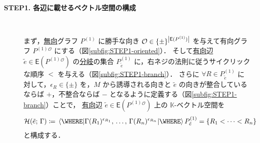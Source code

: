 \documentclass[TQFT_main]{subfiles}
\begin{document}
\begin{description}
    \item[\textbf{STEP1. 各辺に載せるベクトル空間の構成}]　

    まず，\underline{無向}グラフ $P^{(1)}$ に勝手な向き $\mathcal{O} \in \{\pm\}^{\abs{\mathsf{E}(P^{(1)})}}$ を与えて有向グラフ $P^{(1)}{}^{\mathcal{O}}$ にする（図\ref{subfig:STEP1-oriented}）．
    そして\underline{有向}辺 $\tilde{e} \in \mathsf{E}(P^{(1)}{}^{\mathcal{O}})$ の\hyperref[def:polyhedron]{分岐}の集合 $P^{(1)}_{\tilde{e}}$ に，右ネジの法則に従うサイクリックな順序 $<$ を与える（図\ref{subfig:STEP1-branch}）．
    さらに $\forall R \in P_{\tilde{e}}^{(1)}$ に対して，$\epsilon_R \in \{\pm\}$ を，$M$ から誘導される向きと $\tilde{e}$ の向きが整合しているならば $+$，不整合ならば $-$ となるように定義する（図\ref{subfig:STEP1-branch}）ことで，
    \underline{有向}辺 $\tilde{e} \in \mathsf{E}(P^{(1)}{}^{\mathcal{O}})$ 上の $\mathbb{K}$-ベクトル空間を
    \begin{align}
        \mathcal{H}(\tilde{e};\, \Gamma) \coloneqq \expval{\Gamma(R_1)^{\epsilon_{R_1}},\, \dots,\, \Gamma(R_n)^{\epsilon_{R_n}}} \WHERE P_{\tilde{e}}^{(1)} = \{R_1 < \cdots < R_n\}
    \end{align}
    と構成する．

    \begin{figure}[H]
        \centering
        \begin{subfigure}{0.4\columnwidth}
            \centering
\end{subfigure}
\end{figure}
\end{description}
\end{document}
